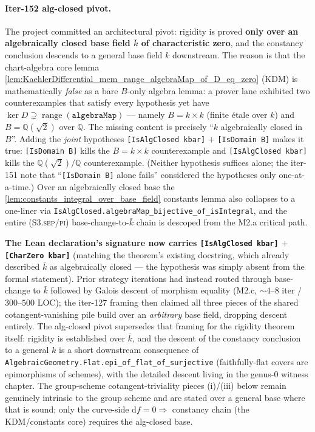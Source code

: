 \paragraph{Iter-152 alg-closed pivot.} The project committed an architectural pivot: rigidity is proved \textbf{only over an algebraically closed base field \(\bar k\) of characteristic zero}, and the constancy conclusion descends to a general base field \(k\) downstream. The reason is that the chart-algebra core lemma \cref{lem:KaehlerDifferential_mem_range_algebraMap_of_D_eq_zero} (KDM) is mathematically \emph{false} as a bare \(B\)-only algebra lemma: a prover lane exhibited two counterexamples that satisfy every hypothesis yet have \(\ker D \supsetneq \operatorname{range}(\mathtt{algebraMap})\) --- namely \(B = k \times k\) (finite \'etale over \(k\)) and \(B = \mathbb Q(\sqrt 2)\) over \(\mathbb Q\). The missing content is precisely ``\(k\) algebraically closed in \(B\)''. Adding the \emph{joint} hypotheses \texttt{[IsAlgClosed kbar]} \(+\) \texttt{[IsDomain B]} makes it true: \texttt{[IsDomain B]} kills the \(B = k \times k\) counterexample and \texttt{[IsAlgClosed kbar]} kills the \(\mathbb Q(\sqrt 2)/\mathbb Q\) counterexample. (Neither hypothesis suffices alone; the iter-151 note that ``\texttt{[IsDomain B]} alone fails'' considered the hypotheses only one-at-a-time.) Over an algebraically closed base the \cref{lem:constants_integral_over_base_field} constants lemma also collapses to a one-liner via \texttt{IsAlgClosed.algebraMap\_bijective\_of\_isIntegral}, and the entire (S3.\textsc{sep}/\textsc{pi}) base-change-to-\(\bar k\) chain is descoped from the M2.a critical path.

\textbf{The Lean declaration's signature now carries \texttt{[IsAlgClosed kbar]} \(+\) \texttt{[CharZero kbar]}} (matching the theorem's existing docstring, which already described \(\bar k\) as algebraically closed --- the hypothesis was simply absent from the formal statement). Prior strategy iterations had instead routed through base-change to \(\bar k\) followed by Galois descent of morphism equality (M2.c, \(\sim 4\)--\(8\) iter / \(300\)--\(500\) LOC); the iter-127 framing then claimed all three pieces of the shared cotangent-vanishing pile build over an \emph{arbitrary} base field, dropping descent entirely. The alg-closed pivot supersedes that framing for the rigidity theorem itself: rigidity is established over \(\bar k\), and the descent of the constancy conclusion to a general \(k\) is a short downstream consequence of \texttt{AlgebraicGeometry.Flat.epi\_of\_flat\_of\_surjective} (faithfully-flat covers are epimorphisms of schemes), with the detailed descent living in the genus-\(0\) witness chapter. The group-scheme cotangent-triviality pieces (i)/(iii) below remain genuinely intrinsic to the group scheme and are stated over a general base where that is sound; only the curve-side \(\mathrm df = 0 \Rightarrow\) constancy chain (the KDM/constants core) requires the alg-closed base.

